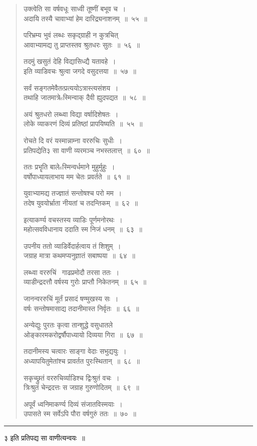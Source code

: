 \documentclass[11pt, openany]{book}
\begin{document}
\begin{multicols}{2}
\begin{quote}
{उक्त्वेति सा वर्षवधूः साध्वी तूष्णीं बभूव च~।\\
अदायि तस्यै चावाभ्यां हेम दारिद्र्यनाशनम्~॥~५५~॥

परिभ्रम्य भुवं लब्धः सकृद्ग्राही न कुत्रचित्\\
आवाभ्यामद्य तु प्राप्तस्तव श्रुतधरः सुतः~॥~५६~॥

तदमुं खसुतं देहि विद्यासिध्द्यै यतावहे~।\\
इति व्याडिवचः श्रुत्वा जगदे वसुदत्तया~॥~५७~॥

सर्वं सङ्गतमेवैतत्प्रत्ययोऽत्रास्त्यसंशय~।\\
तथाहि जातमात्रेsस्मिन्वाक् दैवी ह्युदपद्यत~॥~५८~॥

अयं श्रुतधरो लब्ध्वा विद्या वर्षादिशेषतः~।\\
लोके व्याकरणं दिव्यं प्रतिष्ठां प्रापयिष्यति~॥~५५~॥

रोचते दि वरं यस्मान्नाम्ना वररुचिः सुधीः~।\\
प्रतिपद्येति३ सा वाणी व्यरमञ्च नभस्तलात्त्~॥~६०~॥

ततः प्रभॄति बालेsस्मिन्वर्धमाने मुहुर्मुहुः~।\\
वर्षोपाध्यायलाभाय मम चेतः प्रवर्तते~॥~६१~॥

युवाभ्यामद्य तज्ज्ञातं सन्तोषश्च परो मम~।\\
तदेष युवयोर्भ्राता नीयतां च तदन्तिकम्~॥~६२~॥

इत्याकर्ण्य वचस्तस्य व्याडिः पूर्णमनोरथः~।\\
महोत्सवविधानाय ददाति स्म निजं धनम्~॥~६३~॥

उपनीय ततो व्याडिर्वेदार्हत्वाय तं शिशुम्~।\\
जग्राह मात्रा कथमप्यनुज्ञातं सबाष्पया~॥~६४~॥

लब्ध्वा वररुचिं \textendash\ गाढप्रमोदौ तरसा ततः~।\\
व्याडीन्द्रदत्तौ वर्षस्य गुरोः प्राप्तौ निकेतनम्~॥~६५~॥

जानन्वररुचिं मूर्तं प्रसादं षण्मुखस्य सः~।\\
वर्षः सन्तोषमासाद्य तदानीमास्त निर्वृतः~॥~६६~॥

अन्येद्युः पुरतः कृत्वा तान्शुद्धे वसुधातले\\
ओङ्कारमकरोद्वर्षौपाध्यायो दिव्यया गिरा~॥~६७~॥

तदानीमस्य चत्वारः साङ्गा वेदाः सभुद्ययुः~।\\
अध्यापयितुमेतांश्च प्रावर्तत पुरःस्थितान्~॥~६८~॥

सकृच्छ्रुतं वररुचिर्व्याडिश्च द्विःश्रुतं वचः~।\\
त्रिःश्रुतं चेन्द्रदत्तः स जग्राह गुरुणोदितम्~॥~६९~॥

अपूर्वं ध्वनिमाकर्ण्य दिव्यं संजातविस्मयाः~।\\
उपासते स्म सर्वेऽपि पौरा वर्षगुरुं ततः~॥~७०~॥}
\end{quote}

\rule{0.9\linewidth}{0.5pt}

३ इति प्रतिपद्य सा वाणीत्यन्वयः~॥ 
\end{multicols}
\end{document}
